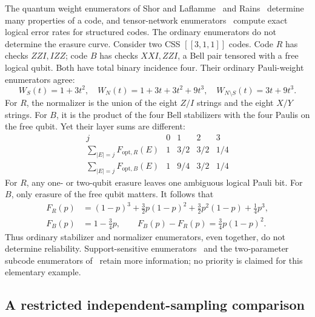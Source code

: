 \documentclass[11pt]{article}
\theoremstyle{remark}
\begin{document}
The quantum weight enumerators of Shor and Laflamme~\cite{shorlaflamme1997}
and Rains~\cite{rains1998} determine many properties of a code, and
tensor-network enumerators~\cite{caolackey2022,cao2024expansion} compute
exact logical error rates for structured codes. The ordinary enumerators
do not determine the erasure curve.
Consider two CSS \([[3,1,1]]\) codes. Code \(R\) has checks
\(ZZI,IZZ\); code \(B\) has checks \(XXI,ZZI\), a Bell pair
tensored with a free logical qubit. Both have total binary incidence
four. Their ordinary Pauli-weight enumerators agree:
\[
 W_S(t)=1+3t^2,\quad
 W_N(t)=1+3t+3t^2+9t^3,\quad
 W_{N\setminus S}(t)=3t+9t^3.
\]
For \(R\), the normalizer is the union of the eight \(Z/I\) strings
and the eight \(X/Y\) strings. For \(B\), it is the product of the
four Bell stabilizers with the four Paulis on the free qubit.
Yet their layer sums are different:
\[
\begin{array}{c|cccc}
j&0&1&2&3\\ \hline
\sum_{|E|=j}F_{\mathrm{opt},R}(E)&1&3/2&3/2&1/4\\
\sum_{|E|=j}F_{\mathrm{opt},B}(E)&1&9/4&3/2&1/4
\end{array}
\]
For \(R\), any one- or two-qubit erasure leaves one ambiguous
logical Pauli bit. For \(B\), only erasure of the free qubit
matters. It follows that
\begin{align*}
 F_R(p)&=(1-p)^3+\tfrac32p(1-p)^2+\tfrac32p^2(1-p)+\tfrac14p^3,\\
 F_B(p)&=1-\tfrac34p,\qquad
 F_B(p)-F_R(p)=\tfrac34p(1-p)^2.
\end{align*}
Thus ordinary stabilizer and normalizer enumerators, even together,
do not determine reliability. Support-sensitive
enumerators~\cite{scott2005,cao2024expansion} and the two-parameter
subcode enumerators of~\cite{ashikhmin2020} retain more information;
no priority is claimed for this elementary example.

\subsection{A restricted independent-sampling comparison}
\label{sec:sampling}
\end{document}
